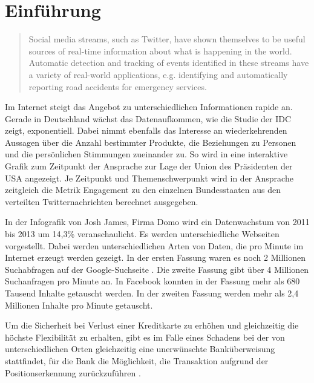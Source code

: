 \chapter{Einführung}

\begin{quote}
Social media streams, such as Twitter, have shown themselves to be useful sources of real-time information about what is happening in the world. Automatic detection and tracking of events identified in these streams have a variety of real-world applications, e.g. identifying and automatically reporting road accidents for emergency services.
\end{quote}

Im Internet steigt das Angebot zu unterschiedlichen Informationen rapide an. Gerade in Deutschland wächst das Datenaufkommen, wie die Studie der IDC  zeigt, exponentiell. Dabei nimmt ebenfalls das Interesse an wiederkehrenden Aussagen über die Anzahl bestimmter Produkte, die Beziehungen zu Personen und die persönlichen Stimmungen zueinander zu. So wird in  eine interaktive Grafik zum Zeitpunkt der Ansprache zur Lage der Union des Präsidenten der USA angezeigt. Je Zeitpunkt und Themenschwerpunkt wird in der Ansprache zeitgleich die Metrik Engagement zu den einzelnen Bundesstaaten aus den verteilten Twitternachrichten berechnet ausgegeben.
%

In der Infografik  von Josh James, Firma Domo wird ein Datenwachstum von 2011 bis 2013 um 14,3\% veranschaulicht. Es werden unterschiedliche Webseiten vorgestellt. Dabei werden unterschiedlichen Arten von Daten, die pro Minute im Internet erzeugt werden gezeigt. 
In der ersten Fassung  waren es noch 2 Millionen Suchabfragen auf der Google-Suchseite . Die zweite Fassung gibt über 4 Millionen Suchanfragen pro Minute an. In Facebook  konnten in der Fassung mehr als 680 Tausend Inhalte getauscht werden. In der zweiten Fassung werden mehr als 2,4 Millionen Inhalte pro Minute getauscht. 

Um die Sicherheit bei Verlust einer Kreditkarte zu erhöhen und gleichzeitig die höchste Flexibilität zu erhalten, gibt es im Falle eines Schadens bei der von unterschiedlichen Orten gleichzeitig eine unerwünschte Banküberweisung stattfindet, für die Bank die Möglichkeit, die Transaktion aufgrund der Positionserkennung zurückzuführen .

